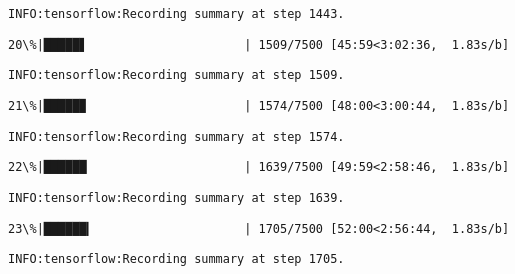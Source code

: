 \documentclass[11pt]{article}
\begin{document}
    \begin{Verbatim}[commandchars=\\\{\}]
INFO:tensorflow:Recording summary at step 1443.

    \end{Verbatim}

    \begin{Verbatim}[commandchars=\\\{\}]
 20\%|█████▋                      | 1509/7500 [45:59<3:02:36,  1.83s/b]
    \end{Verbatim}

    \begin{Verbatim}[commandchars=\\\{\}]
INFO:tensorflow:Recording summary at step 1509.

    \end{Verbatim}

    \begin{Verbatim}[commandchars=\\\{\}]
 21\%|█████▉                      | 1574/7500 [48:00<3:00:44,  1.83s/b]
    \end{Verbatim}

    \begin{Verbatim}[commandchars=\\\{\}]
INFO:tensorflow:Recording summary at step 1574.

    \end{Verbatim}

    \begin{Verbatim}[commandchars=\\\{\}]
 22\%|██████                      | 1639/7500 [49:59<2:58:46,  1.83s/b]
    \end{Verbatim}

    \begin{Verbatim}[commandchars=\\\{\}]
INFO:tensorflow:Recording summary at step 1639.

    \end{Verbatim}

    \begin{Verbatim}[commandchars=\\\{\}]
 23\%|██████▎                     | 1705/7500 [52:00<2:56:44,  1.83s/b]
    \end{Verbatim}

    \begin{Verbatim}[commandchars=\\\{\}]
INFO:tensorflow:Recording summary at step 1705.

    \end{Verbatim}
\end{document}
